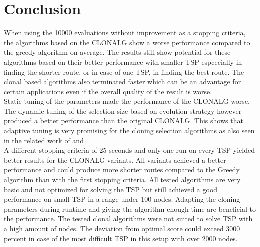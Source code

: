 \chapter{Conclusion}
\label{chap:con}
When using the 10000 evaluations without improvement as a stopping criteria, the algorithms based on the CLONALG show a worse performance compared to the greedy algorithm on average. The results still show potential for these algorithms based on their better performance with smaller TSP espcecially in finding the shorter route, or in case of one TSP, in finding the best route. The clonal based algorithms also terminated faster which can be an advantage for certain applications even if the overall quality of the result is worse.\\
Static tuning of the parameters made the performance of the CLONALG worse. The dynamic tuning of the selection size based on evolution strategy however produced a better performance than the original CLONALG. This shows that adaptive tuning is very promising for the cloning selection algorithms as also seen in the related work of \cite{Garret04} and \Cite{RIFF09}.\\
A different stopping criteria of 25 seconds and only one run on every TSP yielded better results for the CLONALG variants. All variants achieved a better performance and could produce more shorter routes compared to the Greedy algorithm than with the first stopping criteria. All tested algorithms are very basic and not optimized for solving the TSP but still achieved a good performance on small TSP in a range under 100 nodes. Adapting the cloning parameters during runtime and giving the algorithm enough time are beneficial to the performance. The tested clonal algorithms were not suited to solve TSP with a high amount of nodes. The deviation from optimal score could exceed 3000 percent in case of the most difficult TSP in this setup with over 2000 nodes. 